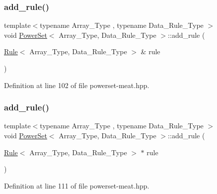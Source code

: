 \subsubsection{\texorpdfstring{add\+\_\+rule()}{add\_rule()}\hspace{0.1cm}{\footnotesize\ttfamily [1/3]}}
{\footnotesize\ttfamily template$<$typename Array\+\_\+\+Type , typename Data\+\_\+\+Rule\+\_\+\+Type $>$ \\
void \hyperlink{class_power_set}{Power\+Set}$<$ Array\+\_\+\+Type, Data\+\_\+\+Rule\+\_\+\+Type $>$\+::add\+\_\+rule (\begin{DoxyParamCaption}\item[{\hyperlink{class_rule}{Rule}$<$ Array\+\_\+\+Type, Data\+\_\+\+Rule\+\_\+\+Type $>$ \&}]{rule }\end{DoxyParamCaption})\hspace{0.3cm}{\ttfamily [inline]}}



Definition at line 102 of file powerset-\/meat.\+hpp.

\mbox{\label{class_power_set_a6cb8fb8f09b4c190e2ac6c07daa1241e}} 
\subsubsection{\texorpdfstring{add\+\_\+rule()}{add\_rule()}\hspace{0.1cm}{\footnotesize\ttfamily [2/3]}}
{\footnotesize\ttfamily template$<$typename Array\+\_\+\+Type , typename Data\+\_\+\+Rule\+\_\+\+Type $>$ \\
void \hyperlink{class_power_set}{Power\+Set}$<$ Array\+\_\+\+Type, Data\+\_\+\+Rule\+\_\+\+Type $>$\+::add\+\_\+rule (\begin{DoxyParamCaption}\item[{\hyperlink{class_rule}{Rule}$<$ Array\+\_\+\+Type, Data\+\_\+\+Rule\+\_\+\+Type $>$ $\ast$}]{rule }\end{DoxyParamCaption})\hspace{0.3cm}{\ttfamily [inline]}}



Definition at line 111 of file powerset-\/meat.\+hpp.

\mbox{\label{class_power_set_aae5eae12186fff037efa3884ac2b3dcc}} 
